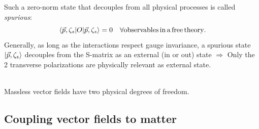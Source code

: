 Such a zero-norm state that decouples from all physical processes is called \emph{spurious}:
\begin{equation}
	\expval{O}{\vec{p},\zeta_s} = 0 \quad \forall \mathrm{observables \, in \, a \, free \, theory.}
	\end{equation}
Generally, as long as the interactions respect gauge invariance, a spurious state $\ket{\vec{p},\zeta_s}$ decouples from the S-matrix as an external (in or out) state $\Rightarrow$ Only the 2 transverse polarizations are physically relevant as external state.
\\
\\
\begin{statements}
	Massless vector fields have two physical degrees of freedom.
\end{statements}



\subsection{Coupling vector fields to matter}

